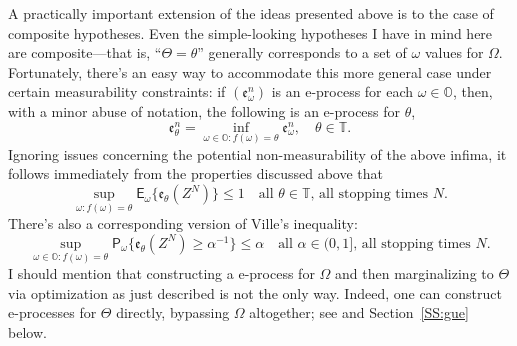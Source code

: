 \documentclass[a4paper, 12pt]{article}
\theoremstyle{plain}
\theoremstyle{definition}
\theoremstyle{remark}
\newcommand{\prob}{\mathsf{P}}
\newcommand{\E}{\mathsf{E}}
\newcommand{\OO}{\mathbb{O}}
\newcommand{\TT}{\mathbb{T}}
\newcommand{\eval}{\mathfrak{e}}
\begin{document}
A practically important extension of the ideas presented above is to the case of composite hypotheses.  Even the simple-looking hypotheses I have in mind here are composite---that is, ``$\Theta=\theta$'' generally corresponds to a set of $\omega$ values for $\Omega$.
Fortunately, there's an easy way to accommodate this more general case under certain measurability constraints: if  $(\eval_\omega^n)$ is an e-process for each $\omega \in \OO$, then, with a minor abuse of notation, the following is an e-process for $\theta$,
\[ \eval_\theta^n = \inf_{\omega \in \OO: f(\omega) = \theta} \eval_\omega^n, \quad \theta \in \TT. \]
Ignoring issues concerning the potential non-measurability of the above infima,
it follows immediately from the properties discussed above that 
\begin{equation}
\label{eq:eval.bound}
\sup_{\omega: f(\omega) = \theta} \E_\omega \{\eval_\theta(Z^N) \} \leq 1 \quad \text{all $\theta \in \TT$, all stopping times $N$}. 
\end{equation}
There's also a corresponding version of Ville's inequality:
\begin{equation}
\label{eq:ville}
\sup_{\omega \in \OO: f(\omega) = \theta} \prob_\omega\bigl\{ \eval_\theta(Z^N) \geq \alpha^{-1} \bigr\} \leq \alpha \quad \text{all $\alpha \in (0,1]$, all stopping times $N$}. 
\end{equation}
I should mention that constructing a e-process for $\Omega$ and then marginalizing to $\Theta$ via optimization as just described is not the only way.  Indeed, one can construct e-processes for $\Theta$ directly, bypassing $\Omega$ altogether; see \citet{dey.gue} and Section~\ref{SS:gue} below. 
\end{document}
